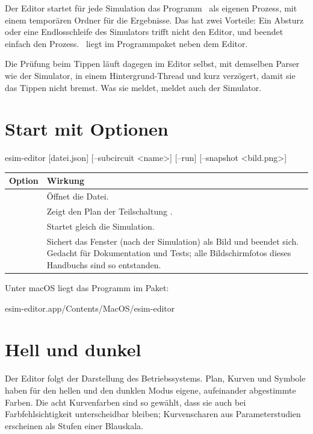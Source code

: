 Der Editor startet für jede Simulation das Programm \esim\ als eigenen
Prozess, mit einem temporären Ordner für die Ergebnisse. Das hat zwei
Vorteile: Ein Absturz oder eine Endlosschleife des Simulators trifft nicht
den Editor, und  beendet einfach den Prozess. \esim\ liegt im
Programmpaket neben dem Editor.

Die Prüfung beim Tippen läuft dagegen im Editor selbst, mit demselben
Parser wie der Simulator, in einem Hintergrund-Thread und kurz verzögert,
damit sie das Tippen nicht bremst. Was sie meldet, meldet auch der
Simulator.

\section{Start mit Optionen}

\begin{shell}
esim-editor [datei.json] [--subcircuit <name>] [--run] [--snapshot <bild.png>]
\end{shell}

\begin{tabularx}{\textwidth}{@{}lL@{}}
  \toprule
  Option & Wirkung \\
  \midrule
   & Öffnet die Datei. \\
   & Zeigt den Plan der Teilschaltung . \\
   & Startet gleich die Simulation. \\
   & Sichert das Fenster (nach der Simulation) als Bild und beendet sich. Gedacht für Dokumentation und Tests; alle Bildschirmfotos dieses Handbuchs sind so entstanden. \\
  \bottomrule
\end{tabularx}

Unter macOS liegt das Programm im Paket:

\begin{shell}
esim-editor.app/Contents/MacOS/esim-editor
\end{shell}

\section{Hell und dunkel}

Der Editor folgt der Darstellung des Betriebssystems. Plan, Kurven und
Symbole haben für den hellen und den dunklen Modus eigene, aufeinander
abgestimmte Farben. Die acht Kurvenfarben sind so gewählt, dass sie auch bei
Farbfehlsichtigkeit unterscheidbar bleiben; Kurvenscharen aus
Parameterstudien erscheinen als Stufen einer Blauskala.
